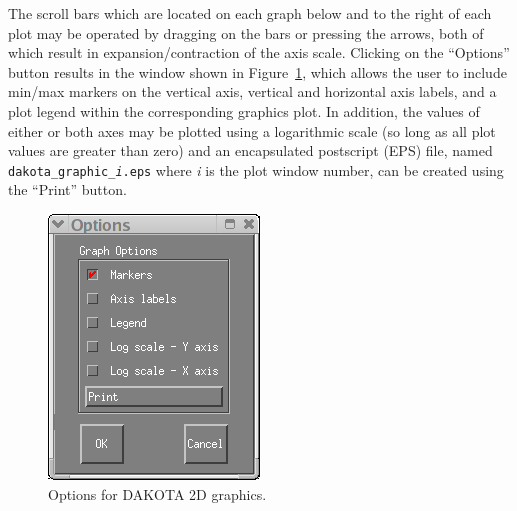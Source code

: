 The scroll bars which are located on each graph below and to the right
of each plot may be operated by dragging on the bars or pressing the
arrows, both of which result in expansion/contraction of the axis
scale. Clicking on the ``Options'' button results in the window shown
in Figure~\ref{output:2dcontoptions}, which allows the user to include
min/max markers on the vertical axis, vertical and horizontal axis
labels, and a plot legend within the corresponding graphics plot.  In
addition, the values of either or both axes may be plotted using a
logarithmic scale (so long as all plot values are greater than zero)
and an encapsulated postscript (EPS) file, named 
\texttt{dakota\_graphic\_\emph{i}.eps} where \emph{i} is the plot 
window number, can be created using the ``Print'' button.
\begin{figure}
\centering
\includegraphics[scale=0.6]{images/container_graphic_options}
\caption{Options for DAKOTA 2D graphics.}
\label{output:2dcontoptions}
\end{figure}

